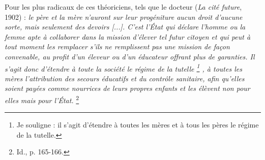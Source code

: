 Pour les plus radicaux de ces théoriciens, tels que le docteur  (\emph{La cité future}, 1902) : {\emph{le père et la mère n'auront sur leur progéniture aucun droit d'aucune sorte, mais seulement des devoirs \emph{[...]}. C'est l'État qui déclare l'homme ou la femme apte à collaborer dans la mission d'élever tel futur citoyen et qui peut à tout moment les remplacer s'ils ne remplissent pas une mission de façon convenable, au profit d'un éleveur ou d'un éducateur offrant plus de garanties. Il s'agit donc d'étendre à toute la société le régime de la tutelle%
\footnote{Je souligne : il s'agit d'étendre à toutes les mères et à tous les pères le régime de la tutelle.}%
, à toutes les mères l'attribution des secours éducatifs et du contrôle sanitaire, afin qu'elles soient payées comme nourrices de leurs propres enfants et les élèvent non pour elles mais pour l'État.}%
\footnote{Id., p. 165-166.}%
\fup{,$\!$}%
}
